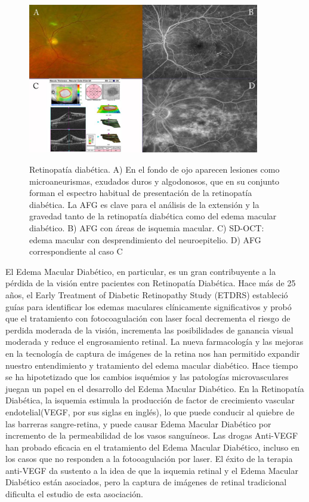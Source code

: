 \begin{figure}[H]
\centering
\includegraphics[width=0.9\textwidth]{./Figures/RD_AF.png}
\label{fig:lightfilter}
\caption{ Retinopatía diabética. A) En el fondo de ojo aparecen lesiones como microaneurismas, exudados duros y algodonosos, que en su conjunto forman el espectro habitual de presentación de la retinopatía diabética. La AFG es clave para el análisis de la extensión y la gravedad tanto de la retinopatía diabética como del edema macular diabético. B) AFG con áreas de isquemia macular. C) SD-OCT: edema macular con desprendimiento del neuroepitelio. D) AFG correspondiente al caso C}
\end{figure}

El Edema Macular Diab\'etico, en particular, es un gran contribuyente a la p\'erdida de la visi\'on  entre pacientes con Retinopat\'ia Diab\'etica. Hace m\'as de 25 a\~nos, el Early Treatment of Diabetic Retinopathy Study (ETDRS) estableci\'o gu\'ias para identificar los edemas maculares cl\'inicamente significativos y prob\'o que el tratamiento con fotocoagulaci\'on con laser focal decrementa el riesgo de perdida moderada de la visi\'on, incrementa las posibilidades de ganancia visual moderada y reduce el engrosamiento retinal. La nueva farmacolog\'ia y las mejoras en la tecnolog\'ia de captura de im\'agenes de la retina nos han permitido expandir nuestro entendimiento y tratamiento del edema macular diab\'etico.
Hace tiempo se ha hipotetizado que los cambios isqu\'emios y las patolog\'ias microvasculares  juegan un papel en el desarrollo del Edema Macular Diab\'etico. En la Retinopat\'ia Diab\'etica, la isquemia estimula la producci\'on de factor de crecimiento vascular endotelial(VEGF, por sus siglas en ingl\'es), lo que puede conducir al quiebre de las barreras sangre-retina, y puede causar Edema Macular Diab\'etico por incremento de la permeabilidad de los vasos sangu\'ineos. Las drogas Anti-VEGF han probado eficacia en el tratamiento del Edema Macular Diab\'etico, incluso en los casos que no responden a la fotooagulaci\'on por laser. El \'exito de la terapia anti-VEGF da sustento a la idea de que la isquemia retinal y el Edema Macular Diab\'etico est\'an asociados, pero la captura de im\'agenes de retinal tradicional dificulta el estudio de esta asociaci\'on. \citep{wessel2012peripheral}
\\


